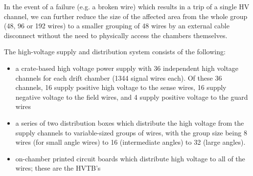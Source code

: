 In the event of a failure (e.g. a broken wire) which results in a trip
of a single HV channel, we can further reduce the size of the affected
area from the whole group (48, 96 or 192 wires) to a smaller grouping
of 48 wires by an external cable disconnect without the need to 
physically access the chambers themselves.

The high-voltage supply and distribution system consists of the following:
\begin{itemize}
\item a crate-based high voltage power supply with 36 independent
high voltage channels for each drift chamber (1344 signal wires each).
Of these 36 channels, 16 supply positive high voltage to the sense
wires, 16 supply negative voltage to the field wires, and 4 supply
positive voltage to the guard wires
\item a series of two distribution boxes which distribute the high
voltage from the supply channels to variable-sized groups
of wires, with the group size being 8 wires (for small angle wires)
to 16 (intermediate angles) to 32 (large angles). 
\item  on-chamber printed circuit boards which distribute high voltage
to all of the wires; these are the HVTB's
\end{itemize}



